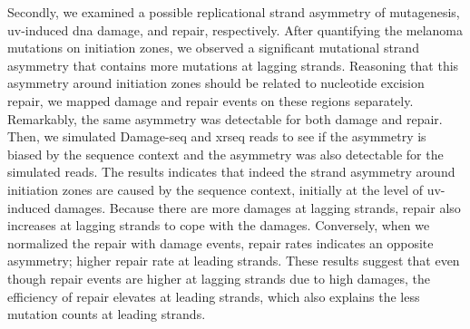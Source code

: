 Secondly, we examined a possible replicational strand asymmetry of mutagenesis, \gls{uv}-induced \gls{dna} damage, and repair, respectively. After quantifying the melanoma mutations on initiation zones, we observed a significant mutational strand asymmetry that contains more mutations at lagging strands. Reasoning that this asymmetry around initiation zones should be related to nucleotide excision repair, we mapped damage and repair events on these regions separately. Remarkably, the same asymmetry was detectable for both damage and repair. Then, we simulated Damage-seq and \gls{xrseq} reads to see if the asymmetry is biased by the sequence context and the asymmetry was also detectable for the simulated reads. The results indicates that indeed the strand asymmetry around initiation zones are caused by the sequence context, initially at the level of \gls{uv}-induced damages. Because there are more damages at lagging strands, repair also increases at lagging strands to cope with the damages. Conversely, when we normalized the repair with damage events, repair rates indicates an opposite asymmetry; higher repair rate at leading strands. These results suggest that even though repair events are higher at lagging strands due to high damages, the efficiency of repair elevates at leading strands, which also explains the less mutation counts at leading strands.         
